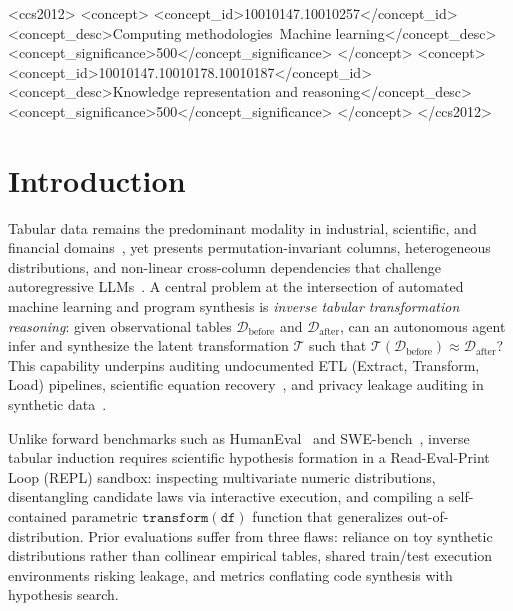 \documentclass[sigconf]{acmart}
\begin{document}
\begin{CCSXML}
<ccs2012>
   <concept>
       <concept_id>10010147.10010257</concept_id>
       <concept_desc>Computing methodologies~Machine learning</concept_desc>
       <concept_significance>500</concept_significance>
   </concept>
   <concept>
       <concept_id>10010147.10010178.10010187</concept_id>
       <concept_desc>Knowledge representation and reasoning</concept_desc>
       <concept_significance>500</concept_significance>
   </concept>
</ccs2012>
\end{CCSXML}


\maketitle

\section{Introduction}
Tabular data remains the predominant modality in industrial, scientific, and financial domains~\cite{borisov2022deep,grinsztajn2022tree}, yet presents permutation-invariant columns, heterogeneous distributions, and non-linear cross-column dependencies that challenge autoregressive LLMs~\cite{sui2024table}. A central problem at the intersection of automated machine learning and program synthesis is \emph{inverse tabular transformation reasoning}: given observational tables $\mathcal{D}_{\text{before}}$ and $\mathcal{D}_{\text{after}}$, can an autonomous agent infer and synthesize the latent transformation $\mathcal{T}$ such that $\mathcal{T}(\mathcal{D}_{\text{before}}) \approx \mathcal{D}_{\text{after}}$? This capability underpins auditing undocumented ETL (Extract, Transform, Load) pipelines, scientific equation recovery~\cite{schmidt2009distilling,udrescu2020ai}, and privacy leakage auditing in synthetic data~\cite{stadler2022synthetic}.

Unlike forward benchmarks such as HumanEval~\cite{chen2021evaluating} and SWE-bench~\cite{jimenez2024swebench}, inverse tabular induction requires scientific hypothesis formation in a Read-Eval-Print Loop (REPL) sandbox: inspecting multivariate numeric distributions, disentangling candidate laws via interactive execution, and compiling a self-contained parametric $\texttt{transform}(\texttt{df})$ function that generalizes out-of-distribution. Prior evaluations suffer from three flaws: reliance on toy synthetic distributions rather than collinear empirical tables, shared train/test execution environments risking leakage, and metrics conflating code synthesis with hypothesis search.
\end{document}
